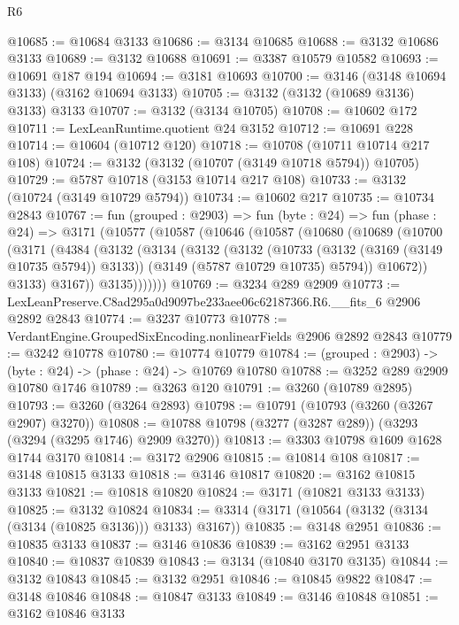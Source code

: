 \begin{lexlean}{R6}
\begin{coremodule}
@10685 := @10684 @3133
@10686 := @3134 @10685
@10688 := @3132 @10686 @3133
@10689 := @3132 @10688
@10691 := @3387 @10579 @10582
@10693 := @10691 @187 @194
@10694 := @3181 @10693
@10700 := @3146 (@3148 @10694 @3133) (@3162 @10694 @3133)
@10705 := @3132 (@3132 (@10689 @3136) @3133) @3133
@10707 := @3132 (@3134 @10705)
@10708 := @10602 @172
@10711 := LexLeanRuntime.quotient @24 @3152
@10712 := @10691 @228
@10714 := @10604 (@10712 @120)
@10718 := @10708 (@10711 @10714 @217 @108)
@10724 := @3132 (@3132 (@10707 (@3149 @10718 @5794)) @10705)
@10729 := @5787 @10718 (@3153 @10714 @217 @108)
@10733 := @3132 (@10724 (@3149 @10729 @5794))
@10734 := @10602 @217
@10735 := @10734 @2843
@10767 := fun (grouped : @2903) =>
  fun (byte : @24) =>
  fun (phase : @24) =>
  @3171
    (@10577
      (@10587
        (@10646
          (@10587
            (@10680
              (@10689
                (@10700
                  (@3171
                    (@4384
                      (@3132
                        (@3134
                          (@3132
                            (@3132
                              (@10733 (@3132 (@3169 (@3149 @10735 @5794)) @3133))
                              (@3149 (@5787 @10729 @10735) @5794))
                            @10672))
                        @3133)
                      @3167))
                  @3135)))))))
@10769 := @3234 @289 @2909
@10773 := LexLeanPreserve.C8ad295a0d9097be233aee06c62187366.R6.__fits_6 @2906 @2892 @2843
@10774 := @3237 @10773
@10778 := VerdantEngine.GroupedSixEncoding.nonlinearFields @2906 @2892 @2843
@10779 := @3242 @10778
@10780 := @10774 @10779
@10784 := (grouped : @2903) -> (byte : @24) -> (phase : @24) -> @10769 @10780
@10788 := @3252 @289 @2909 @10780 @1746
@10789 := @3263 @120
@10791 := @3260 (@10789 @2895)
@10793 := @3260 (@3264 @2893)
@10798 := @10791 (@10793 (@3260 (@3267 @2907) @3270))
@10808 := @10788 @10798 (@3277 (@3287 @289)) (@3293 (@3294 (@3295 @1746) @2909 @3270))
@10813 := @3303 @10798 @1609 @1628 @1744 @3170
@10814 := @3172 @2906
@10815 := @10814 @108
@10817 := @3148 @10815 @3133
@10818 := @3146 @10817
@10820 := @3162 @10815 @3133
@10821 := @10818 @10820
@10824 := @3171 (@10821 @3133 @3133)
@10825 := @3132 @10824
@10834 := @3314 (@3171 (@10564 (@3132 (@3134 (@3134 (@10825 @3136))) @3133) @3167))
@10835 := @3148 @2951
@10836 := @10835 @3133
@10837 := @3146 @10836
@10839 := @3162 @2951 @3133
@10840 := @10837 @10839
@10843 := @3134 (@10840 @3170 @3135)
@10844 := @3132 @10843
@10845 := @3132 @2951
@10846 := @10845 @9822
@10847 := @3148 @10846
@10848 := @10847 @3133
@10849 := @3146 @10848
@10851 := @3162 @10846 @3133

\end{coremodule}
\end{lexlean}
